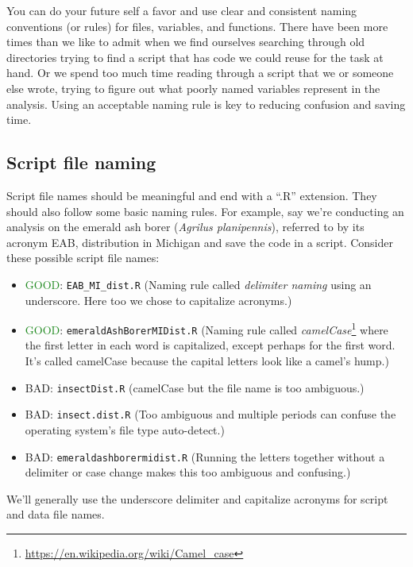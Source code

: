 \documentclass[
  11pt,
]{krantz}
\providecommand{\tightlist}{%
  \setlength{\itemsep}{0pt}\setlength{\parskip}{0pt}}
\theoremstyle{definition}
\theoremstyle{definition}
\theoremstyle{definition}
\theoremstyle{definition}
\theoremstyle{remark}
\begin{document}
You can do your future self a favor and use clear and consistent naming conventions (or rules) for files, variables, and functions. There have been more times than we like to admit when we find ourselves searching through old directories trying to find a script that has code we could reuse for the task at hand. Or we spend too much time reading through a script that we or someone else wrote, trying to figure out what poorly named variables represent in the analysis. Using an acceptable naming rule is key to reducing confusion and saving time.

\hypertarget{fileNaming}{%
\subsection{Script file naming}\label{fileNaming}}

Script file names should be meaningful and end with a ``.R'' extension. They should also follow some basic naming rules. For example, say we're conducting an analysis on the emerald ash borer (\emph{Agrilus planipennis}), referred to by its acronym EAB, distribution in Michigan and save the code in a script. Consider these possible script file names:

\begin{itemize}
\tightlist
\item
  \textcolor{ForestGreen}{GOOD}: \texttt{EAB\_MI\_dist.R} (Naming rule called \emph{delimiter naming} using an underscore. Here too we chose to capitalize acronyms.)
\item
  \textcolor{ForestGreen}{GOOD}: \texttt{emeraldAshBorerMIDist.R} (Naming rule called \emph{camelCase}\footnote{\url{https://en.wikipedia.org/wiki/Camel_case}} where the first letter in each word is capitalized, except perhaps for the first word. It's called camelCase because the capital letters look like a camel's hump.)
\item
  \textcolor{RedOrange}{BAD}: \texttt{insectDist.R} (camelCase but the file name is too ambiguous.)
\item
  \textcolor{RedOrange}{BAD}: \texttt{insect.dist.R} (Too ambiguous and multiple periods can confuse the operating system's file type auto-detect.)
\item
  \textcolor{RedOrange}{BAD}: \texttt{emeraldashborermidist.R} (Running the letters together without a delimiter or case change makes this too ambiguous and confusing.)
\end{itemize}

We'll generally use the underscore delimiter and capitalize acronyms for script and data file names.
\end{document}
